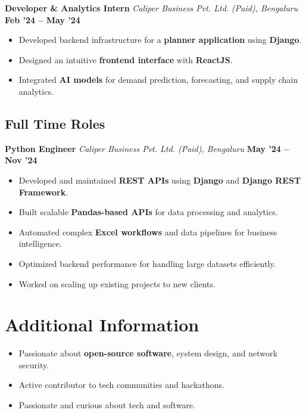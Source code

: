 \documentclass[a4paper,10pt]{article}
\begin{document}
\vspace{0.5em}

\textbf{Developer \& Analytics Intern} \hfill
\textit{Caliper Business Pvt. Ltd. (Paid), Bengaluru} \hfill \textbf{Feb '24 -- May '24}
\begin{itemize}
    \item Developed backend infrastructure for a \textbf{planner application} using \textbf{Django}.
    \item Designed an intuitive \textbf{frontend interface} with \textbf{ReactJS}.
    \item Integrated \textbf{AI models} for demand prediction, forecasting, and supply chain analytics.
\end{itemize}

\vspace{0.5em}

\subsection*{Full Time Roles}

\textbf{Python Engineer} \hfill
\textit{Caliper Business Pvt. Ltd. (Paid), Bengaluru} \hfill \textbf{May '24 -- Nov '24}
\begin{itemize}
    \item Developed and maintained \textbf{REST APIs} using \textbf{Django} and \textbf{Django REST Framework}.
    \item Built scalable \textbf{Pandas-based APIs} for data processing and analytics.
    \item Automated complex \textbf{Excel workflows} and data pipelines for business intelligence.
    \item Optimized backend performance for handling large datasets efficiently.
    \item Worked on scaling up existing projects to new clients.
\end{itemize}

\vspace{0.5em}

\section*{Additional Information}
\begin{itemize}
    \item Passionate about \textbf{open-source software}, system design, and network security.
    \item Active contributor to tech communities and hackathons.
    \item Passionate and curious about tech and software.
\end{itemize}
\end{document}
